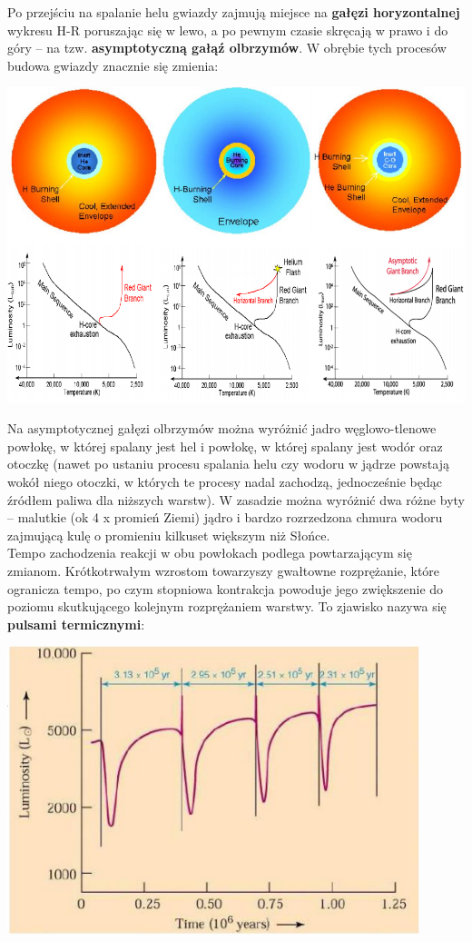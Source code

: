 \documentclass[../index.tex]{subfiles}
\begin{document}
            Po przejściu na spalanie helu gwiazdy zajmują miejsce na \textbf{gałęzi horyzontalnej} wykresu H-R poruszając się w lewo, a po pewnym czasie skręcają w prawo i do góry – na tzw. \textbf{asymptotyczną gałąź olbrzymów}. W obrębie tych procesów budowa gwiazdy znacznie się zmienia:
            \begin{center}
                \includegraphics[width=14cm]{images/ewolucjaGwiazdOlbrzymy.png}
            \end{center}
            Na asymptotycznej gałęzi olbrzymów można wyróżnić jadro węglowo-tlenowe powłokę, w której spalany jest hel i powłokę, w której spalany jest wodór oraz otoczkę (nawet po ustaniu procesu spalania helu czy wodoru w jądrze powstają wokół niego otoczki, w których te procesy nadal zachodzą, jednocześnie będąc źródłem paliwa dla niższych warstw). W zasadzie można wyróżnić dwa różne byty – malutkie (ok 4 x promień Ziemi) jądro i bardzo rozrzedzona chmura wodoru zajmującą kulę o promieniu kilkuset większym niż Słońce.\\
            Tempo zachodzenia reakcji w obu powłokach podlega powtarzającym się zmianom. Krótkotrwałym wzrostom towarzyszy gwałtowne rozprężanie, które ogranicza tempo, po czym stopniowa kontrakcja powoduje jego zwiększenie do poziomu skutkującego kolejnym rozprężaniem warstwy. To zjawisko nazywa się \textbf{pulsami termicznymi}:
            \begin{center}
                \includegraphics[width=12cm]{images/pulsyTermiczne.png}
            \end{center}
\end{document}

